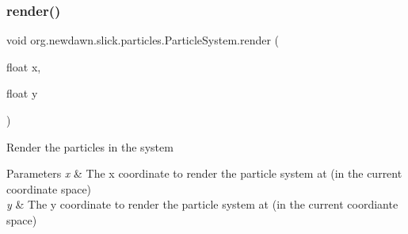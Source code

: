 \subsubsection{\texorpdfstring{render()}{render()}\hspace{0.1cm}{\footnotesize\ttfamily [2/2]}}
{\footnotesize\ttfamily void org.\+newdawn.\+slick.\+particles.\+Particle\+System.\+render (\begin{DoxyParamCaption}\item[{float}]{x,  }\item[{float}]{y }\end{DoxyParamCaption})\hspace{0.3cm}{\ttfamily [inline]}}

Render the particles in the system


\begin{DoxyParams}{Parameters}
{\em x} & The x coordinate to render the particle system at (in the current coordinate space) \\
\hline
{\em y} & The y coordinate to render the particle system at (in the current coordiante space) \\
\hline
\end{DoxyParams}

